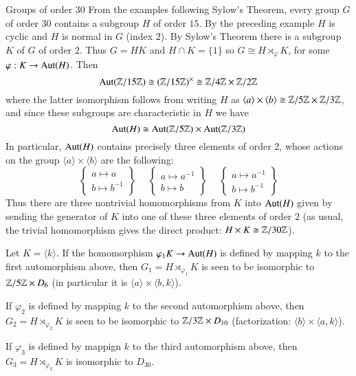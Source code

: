 \documentclass[12pt, a4paper, twoside, openright, titlepage]{book}
\begin{document}
\begin{eg}{Groups of order $30$}{}
    From the examples following Sylow's Theorem, every group $G$ of order $30$ contains a subgroup $H$ of order $15$. By the preceding example $H$ is cyclic and $H$ is normal in $G$ (index $2$). By Sylow's Theorem there is a subgroup $K$ of $G$ of order $2$. Thus $G = HK$ and $H\cap K = \{1\}$ so $G \cong H\rtimes_{\varphi}K$, for some $\varphi:K\rightarrow \operatorname{Aut}(H)$. Then \begin{equation*}
        \operatorname{Aut}(\mathbb Z/15\mathbb Z) \cong (\mathbb Z/15\mathbb Z)^{\times} \cong \mathbb Z/4\mathbb Z\times \mathbb Z/2\mathbb Z
    \end{equation*}
    where the latter isomorphism follows from writing $H$ as $\langle a \rangle \times \langle b \rangle \cong \mathbb Z/5\mathbb Z\times \mathbb Z/3\mathbb Z$, and since these subgroups are characteristic in $H$ we have \begin{equation*}
        \operatorname{Aut}(H) \cong \operatorname{Aut}(\mathbb Z/5\mathbb Z)\times \operatorname{Aut}(\mathbb Z/3\mathbb Z)
    \end{equation*}
    In particular, $\operatorname{Aut}(H)$ contains precisely three elements of order $2$, whose actions on the group $\langle a \rangle \times \langle b \rangle$ are the following: \begin{equation*}
        \left\{\begin{array}{c}a\mapsto a \\ b \mapsto b^{-1}\end{array}\right\}\hspace{15pt} \left\{\begin{array}{c}a\mapsto a^{-1} \\ b \mapsto b \end{array}\right\}\hspace{15pt}\left\{\begin{array}{c}a\mapsto a^{-1} \\ b \mapsto b^{-1}\end{array}\right\}
    \end{equation*}
    Thus there are three nontrivial homomorphisms from $K$ into $\operatorname{Aut}(H)$ given by sending the generator of $K$ into one of these three elements of order $2$ (as usual, the trivial homomorphism gives the direct product: $H\times K \cong \mathbb Z/30\mathbb Z$).

    Let $K = \langle k \rangle$. If the homomorphism $\varphi_1K\rightarrow \operatorname{Aut}(H)$ is defined by mapping $k$ to the first automorphism above, then $G_1 = H\rtimes_{\varphi_1}K$ is seen to be isomorphic to $\mathbb Z/5\mathbb Z\times D_6$ (in particular it is $\langle a \rangle \times \langle b,k\rangle$).

    If $\varphi_2$ is defined by mapping $k$ to the second automorphism above, then $G_2 = H\rtimes_{\varphi_2}K$ is seen to be isomorphic to $\mathbb Z/3\mathbb Z\times D_{10}$ (factorization: $\langle b \rangle \times \langle a,k\rangle$).

    If $\varphi_3$ is defined by mappign $k$ to the third automorphism above, then $G_3=H\rtimes_{\varphi_3}K$ is isomorphic to $D_{30}$.
\end{eg}
\end{document}
